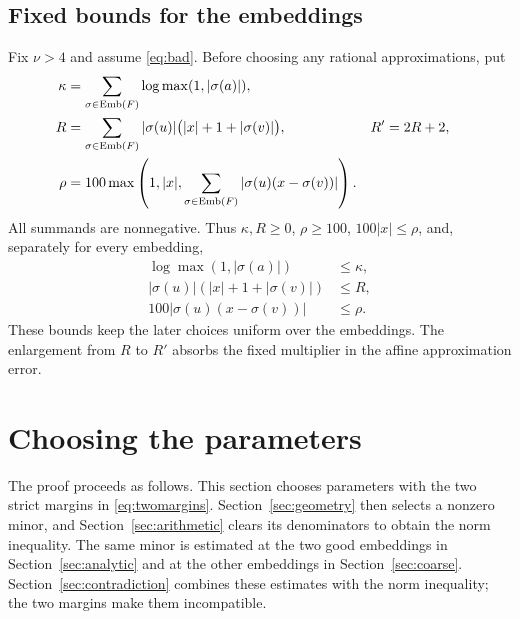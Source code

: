 \documentclass[11pt]{article}
\theoremstyle{definition}
\theoremstyle{remark}
\theoremstyle{plain}
\newcommand{\Emb}{\operatorname{Emb}}
\begin{document}
\subsection{Fixed bounds for the embeddings}
Fix \(\nu>4\) and assume \eqref{eq:bad}. Before choosing any rational
approximations, put
\begin{align}
 \kappa&=\sum_{\sigma\in\Emb(F)}\log\max(1,|\sigma(a)|),\label{eq:budgets}\\
 R&=\sum_{\sigma\in\Emb(F)}|\sigma(u)|\bigl(|x|+1+|\sigma(v)|\bigr),
 &R'&=2R+2,\notag\\
 \rho&=100\max\left(1,|x|,
       \sum_{\sigma\in\Emb(F)}|\sigma(u)(x-\sigma(v))|\right).\notag
\end{align}
All summands are nonnegative. Thus \(\kappa,R\ge0\),
\(\rho\ge100\), \(100|x|\le\rho\), and, separately for every embedding,
\begin{equation}\label{eq:budgetbounds}
 \begin{split}
 \log\max(1,|\sigma(a)|)&\le\kappa,\\
 |\sigma(u)|(|x|+1+|\sigma(v)|)&\le R,\\
 100|\sigma(u)(x-\sigma(v))|&\le\rho.
 \end{split}
\end{equation}
These bounds keep the later choices uniform over the embeddings.
The enlargement from \(R\) to \(R'\) absorbs the
fixed multiplier in the affine approximation error.

\section{Choosing the parameters}\label{sec:parameters}
The proof proceeds as follows. This section chooses parameters with the
two strict margins in \eqref{eq:twomargins}.
Section~\ref{sec:geometry} then selects a nonzero minor, and
Section~\ref{sec:arithmetic} clears its denominators to obtain the norm
inequality. The same minor is estimated at the two good embeddings in
Section~\ref{sec:analytic} and at the other embeddings in
Section~\ref{sec:coarse}. Section~\ref{sec:contradiction} combines these
estimates with the norm inequality; the two margins make them incompatible.
\end{document}
